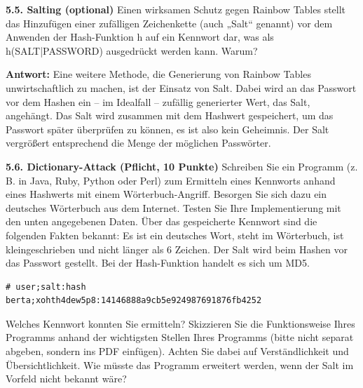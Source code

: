 \documentclass[ngerman]{fbi-aufgabenblatt}
\begin{document}
\textbf{5.5. Salting (optional)}
Einen wirksamen Schutz gegen Rainbow Tables stellt das Hinzufügen einer zufälligen Zeichenkette (auch „Salt“ genannt) vor dem Anwenden der Hash-Funktion h auf ein Kennwort dar, was als h(SALT|PASSWORD) ausgedrückt werden kann. Warum?

\textbf{Antwort:}
Eine weitere Methode, die Generierung von Rainbow Tables unwirtschaftlich zu machen, ist der Einsatz von Salt. Dabei wird an das Passwort vor dem Hashen ein – im Idealfall – zufällig generierter Wert, das Salt, angehängt. Das Salt wird zusammen mit dem Hashwert gespeichert, um das Passwort später überprüfen zu können, es ist also kein Geheimnis. Der Salt vergrößert entsprechend die Menge der möglichen Passwörter.

\textbf{5.6. Dictionary-Attack (Pflicht, 10 Punkte)}
Schreiben Sie ein Programm (z. B. in Java, Ruby, Python oder Perl) zum Ermitteln eines Kennworts anhand eines Hashwerts mit einem Wörterbuch-Angriff. Besorgen Sie sich dazu ein deutsches Wörterbuch aus dem Internet. Testen Sie Ihre Implementierung mit den unten angegebenen Daten. Über das gespeicherte Kennwort sind die folgenden Fakten bekannt: Es ist ein deutsches Wort, steht im Wörterbuch, ist kleingeschrieben und nicht länger als 6 Zeichen. Der Salt wird beim Hashen vor das Passwort gestellt. Bei der Hash-Funktion handelt es sich um MD5. 
\begin{lstlisting}
# user;salt:hash
berta;xohth4dew5p8:14146888a9cb5e924987691876fb4252
\end{lstlisting}
Welches Kennwort konnten Sie ermitteln? Skizzieren Sie die Funktionsweise Ihres Programms anhand der wichtigsten Stellen Ihres Programms (bitte nicht separat abgeben, sondern ins PDF einfügen). Achten Sie dabei auf Verständlichkeit und Übersichtlichkeit.
Wie müsste das Programm erweitert werden, wenn der Salt im Vorfeld nicht bekannt wäre?
\end{document}
